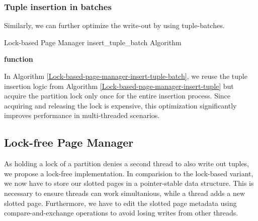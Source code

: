 \subsubsection*{Tuple insertion in batches}
Similarly, we can further optimize the write-out by using tuple-batches.
\begin{algorithm}[h]
\caption{Lock-based Page Manager insert\_tuple\_batch Algorithm}\label{Lock-based-page-manager-insert-tuple-batch}


\textbf{function}
\end{algorithm}
In Algorithm \ref{Lock-based-page-manager-insert-tuple-batch}, we reuse the tuple insertion logic from Algorithm \ref{Lock-based-page-manager-insert-tuple} but acquire the partition lock only once for the entire insertion process.
Since acquiring and releasing the lock is expensive, this optimization significantly improves performance in multi-threaded scenarios.

\subsection{Lock-free Page Manager}
As holding a lock of a partition denies a second thread to also write out tuples, we propose a lock-free implementation.
In comparision to the lock-based variant, we now have to store our slotted pages in a pointer-stable data structure.
This is necessary to ensure threads can work simultanious, while a thread adds a new slotted page.
Furthermore, we have to edit the slotted page metadata using compare-and-exchange operations to avoid losing writes from other threads.



